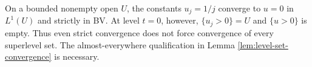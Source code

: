 \begin{example}\label{ex:exceptional-level}
On a bounded nonempty open $U$, the constants $u_j=1/j$ converge to $u=0$ in $L^1(U)$ and strictly in BV. At level $t=0$, however, $\{u_j>0\}=U$ and $\{u>0\}$ is empty. Thus even strict convergence does not force convergence of every superlevel set. The almost-everywhere qualification in Lemma \ref{lem:level-set-convergence} is necessary.
\end{example}
